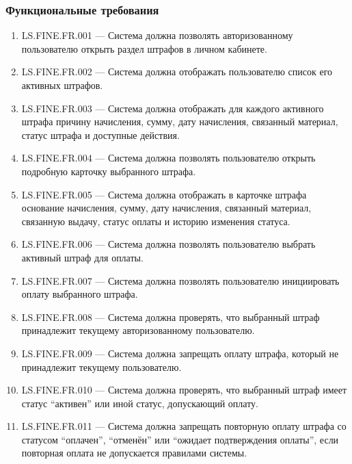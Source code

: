\documentclass[12pt,a4paper]{article}
\begin{document}
	\subsubsection{Функциональные требования}
	
	\begin{enumerate}
		\item LS.FINE.FR.001 --- Система должна позволять авторизованному пользователю
		открыть раздел штрафов в личном кабинете.
		
		\item LS.FINE.FR.002 --- Система должна отображать пользователю список его
		активных штрафов.
		
		\item LS.FINE.FR.003 --- Система должна отображать для каждого активного штрафа
		причину начисления, сумму, дату начисления, связанный материал, статус штрафа
		и доступные действия.
		
		\item LS.FINE.FR.004 --- Система должна позволять пользователю открыть подробную
		карточку выбранного штрафа.
		
		\item LS.FINE.FR.005 --- Система должна отображать в карточке штрафа основание
		начисления, сумму, дату начисления, связанный материал, связанную выдачу,
		статус оплаты и историю изменения статуса.
		
		\item LS.FINE.FR.006 --- Система должна позволять пользователю выбрать активный
		штраф для оплаты.
		
		\item LS.FINE.FR.007 --- Система должна позволять пользователю инициировать
		оплату выбранного штрафа.
		
		\item LS.FINE.FR.008 --- Система должна проверять, что выбранный штраф принадлежит
		текущему авторизованному пользователю.
		
		\item LS.FINE.FR.009 --- Система должна запрещать оплату штрафа, который не
		принадлежит текущему пользователю.
		
		\item LS.FINE.FR.010 --- Система должна проверять, что выбранный штраф имеет
		статус ``активен'' или иной статус, допускающий оплату.
		
		\item LS.FINE.FR.011 --- Система должна запрещать повторную оплату штрафа со
		статусом ``оплачен'', ``отменён'' или ``ожидает подтверждения оплаты'', если
		повторная оплата не допускается правилами системы.
		

\end{enumerate}
\end{document}
